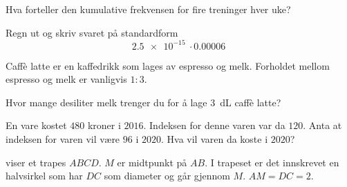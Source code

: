 \begin{oppgaver}
   Hva forteller den kumulative frekvensen for fire treninger hver
    uke?
\end{oppgaver}


\Oppgave[1] 

Regn ut og skriv svaret på standardform
%
\begin{equation*}
  \SI{2.5e-15}{}
  \cdot
  \SI{0.00006}{}
\end{equation*}


\Oppgave[2] 

Caffè latte er en kaffedrikk som lages av espresso og melk.
Forholdet mellom espresso og melk er vanligvis $1\colon3$. \medskip

Hvor mange desiliter melk trenger du for å lage \SI{3}{\deci\liter} caffè latte?


\Oppgave[2] %

En vare kostet $480$ kroner i $2016$. Indeksen for denne varen var da $120$.
Anta at indeksen for varen vil være $96$ i $2020$.
Hva vil varen da koste i $2020$?


\Oppgave[4]

 viser et trapes
$ABCD$. $M$ er midtpunkt på $AB$. I trapeset er det innskrevet en halvsirkel som
har $DC$ som diameter og går gjennom $M$. $AM = DC = 2$.

